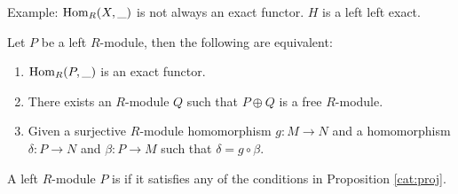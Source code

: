  Example: $\operatorname{Hom}_R(X,\_)$ is not always an exact functor. $H$ is a left left
  exact.

  \begin{prop}\label{cat:proj}
    Let $P$ be a left $R$-module, then the following are equivalent:
    \begin{enumerate}
      \item $\operatorname{Hom}_R(P,\_)$ is an exact functor.
      \item There exists an $R$-module $Q$ such that $P\oplus Q$ is a free
        $R$-module.
      \item Given a surjective $R$-module homomorphism $g:M\to N$ and a
        homomorphism $\delta:P\to N$ and $\beta:P\to M$ such that
        $\delta = g\circ \beta$.
    \end{enumerate}
  \end{prop}

  \begin{define}
    A left $R$-module $P$ is  if it satisfies any of the
    conditions in Proposition \ref{cat:proj}.
  \end{define}
